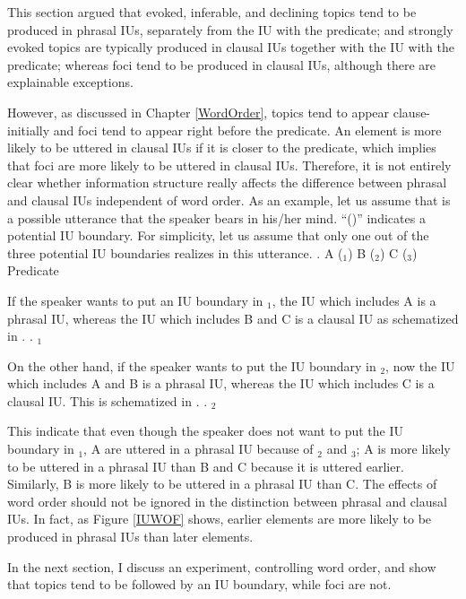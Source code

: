 This section argued that
evoked, inferable, and declining topics tend to be produced in phrasal IUs,
separately from the IU with the predicate; and
strongly evoked topics are typically produced in clausal IUs
together with the IU with the predicate;
whereas foci tend to be produced in clausal IUs,
although there are explainable exceptions.

However, as discussed in Chapter \ref{WordOrder},
topics tend to appear clause-initially and foci tend to appear right before the predicate.
An element is more likely to be uttered in clausal IUs
if it is closer to the predicate,
which implies that
foci are more likely to be uttered in clausal IUs.
Therefore, it is not entirely clear whether information structure really
affects the difference between phrasal and clausal IUs independent of word order.
As an example, let us assume that \Next is a possible utterance that the speaker bears in his/her mind.
``(\tp{\dvline})'' indicates a potential IU boundary.
For simplicity,
let us assume that
only one out of the three potential IU boundaries realizes in this utterance.
%
\ex. A (\tp{\dvline}$_1$) B (\tp{\dvline}$_2$) C (\tp{\dvline}$_3$) Predicate

If the speaker wants to put an IU boundary in \tp{\dvline}$_1$,
the IU which includes A is a phrasal IU,
whereas the IU which includes B and C is a clausal IU
as schematized in \Next.
%
\ex.  \tp{\dvline}$_1$ 

On the other hand, if the speaker wants to put the IU boundary in \tp{\dvline}$_2$,
now the IU which includes A and B is a phrasal IU,
whereas the IU which includes C is a clausal IU.
This is schematized in \Next.
%
\ex.  \tp{\dvline}$_2$ 

This indicate that even though the speaker does not want to put the IU boundary in \tp{\dvline}$_1$,
A are uttered in a phrasal IU because of \tp{\dvline}$_2$ and \tp{\dvline}$_3$;
A is more likely to be uttered in a phrasal IU than B and C because it is uttered earlier.
Similarly, B is more likely to be uttered in a phrasal IU than C.
The effects of word order should not be ignored in the distinction between phrasal and clausal IUs.
In fact,
as Figure \ref{IUWOF} shows,
earlier elements are more likely to be produced in phrasal IUs
than later elements.

In the next section,
I discuss an experiment, controlling word order,
and show that topics tend to be followed by an IU boundary,
while foci are not.





